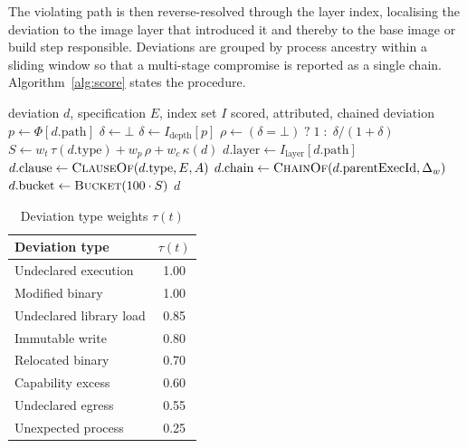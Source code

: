 \documentclass[conference]{IEEEtran}
\begin{document}
The violating path is then reverse-resolved through the layer index,
localising the deviation to the image layer that introduced it and
thereby to the base image or build step responsible. Deviations are
grouped by process ancestry within a sliding window so that a
multi-stage compromise is reported as a single chain.
Algorithm~\ref{alg:score} states the procedure.

\begin{algorithm}[!t]
\footnotesize
\caption{Severity Scoring and Attribution (per deviation)}
\label{alg:score}
\begin{algorithmic}[1]
\Require deviation $d$, specification $E$, index set $I$
\Ensure scored, attributed, chained deviation
\State $p \gets \Phi[d.\text{path}]$
 $\delta \gets \bot$
\Else{} $\delta \gets I_{\text{depth}}[p]$
\EndIf
\State $\rho \gets (\delta = \bot)\;?\;1\;:\;\delta/(1+\delta)$
\State $S \gets w_t\,\tau(d.\text{type}) + w_p\,\rho + w_c\,\kappa(d)$
\State $d.\text{layer} \gets I_{\text{layer}}[d.\text{path}]$
\State $d.\text{clause} \gets \textsc{ClauseOf}(d.\text{type}, E, A)$
\State $d.\text{chain} \gets
        \textsc{ChainOf}(d.\text{parentExecId}, \Delta_w)$
\State $d.\text{bucket} \gets \textsc{Bucket}(100 \cdot S)$
\State \Return $d$
\end{algorithmic}
\end{algorithm}

\begin{table}[!t]
\caption{Deviation type weights $\tau(t)$}
\label{tab:tau}
\centering
\footnotesize
\begin{tabular}{lc}
\toprule
Deviation type & $\tau(t)$ \\
\midrule
Undeclared execution      & 1.00 \\
Modified binary           & 1.00 \\
Undeclared library load   & 0.85 \\
Immutable write           & 0.80 \\
Relocated binary          & 0.70 \\
Capability excess         & 0.60 \\
Undeclared egress         & 0.55 \\
Unexpected process        & 0.25 \\
\bottomrule
\end{tabular}
\end{table}
\end{document}
